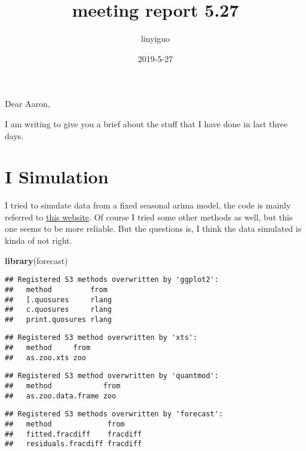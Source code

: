 \documentclass[]{article}
\title{meeting report 5.27}
\author{linyiguo}
\date{2019-5-27}
\newenvironment{Shaded}{\begin{snugshade}}{\end{snugshade}}
\newcommand{\KeywordTok}[1]{\textcolor[rgb]{0.13,0.29,0.53}{\textbf{#1}}}
\newcommand{\NormalTok}[1]{#1}
\begin{document}
\maketitle

Dear Aaron,

I am writing to give you a brief about the stuff that I have done in
last three days.

\hypertarget{i-simulation}{%
\section{I Simulation}\label{i-simulation}}

I tried to simulate data from a fixed seasonal arima model, the code is
mainly referred to
\href{https://robjhyndman.com/hyndsight/simulating-from-a-specified-seasonal-arima-model/}{this
website}. Of course I tried some other methods as well, but this one
seems to be more reliable. But the questions is, I think the data
simulated is kinda of not right.

\begin{Shaded}
\begin{Highlighting}[]
\KeywordTok{library}\NormalTok{(forecast)}
\end{Highlighting}
\end{Shaded}

\begin{verbatim}
## Registered S3 methods overwritten by 'ggplot2':
##   method         from 
##   [.quosures     rlang
##   c.quosures     rlang
##   print.quosures rlang
\end{verbatim}

\begin{verbatim}
## Registered S3 method overwritten by 'xts':
##   method     from
##   as.zoo.xts zoo
\end{verbatim}

\begin{verbatim}
## Registered S3 method overwritten by 'quantmod':
##   method            from
##   as.zoo.data.frame zoo
\end{verbatim}

\begin{verbatim}
## Registered S3 methods overwritten by 'forecast':
##   method             from    
##   fitted.fracdiff    fracdiff
##   residuals.fracdiff fracdiff
\end{verbatim}
\end{document}
